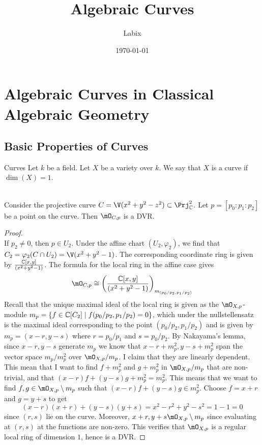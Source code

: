 \documentclass[a4paper]{article}
\title{Algebraic Curves}
\author{Labix}
\date{\today}
\begin{document}
\maketitle
\begin{abstract}
\end{abstract}
\pagebreak
\tableofcontents
\pagebreak

\section{Algebraic Curves in Classical Algebraic Geometry}
\subsection{Basic Properties of Curves}
\begin{defn}{Curves}{} Let $k$ be a field. Let $X$ be a variety over $k$. We say that $X$ is a curve if $\dim(X)=1$. 
\end{defn}

\begin{eg}{}{}\\
Consider the projective curve $C=\V(x^2+y^2-z^2)\subset\Prj_\C^2$. Let $p=[p_0:p_1:p_2]$ be a point on the curve. Then $\mO_{C,p}$ is a DVR. 
\begin{proof}\\
If $p_2\neq 0$, then $p\in U_2$. Under the affine chart $(U_2,\varphi_2)$, we find that $C_2=\varphi_2(C\cap U_2)=\V(x^2+y^2-1)$. The corresponding coordinate ring is given by $\frac{\mathbb{C}[x,y]}{(x^2+y^2-1)}$. The formula for the local ring in the affine case gives $$\mO_{C,p}\cong\left(\frac{\C[x,y]}{(x^2+y^2-1)}\right)_{m_{(p_0/p_2,p_1/p_2)}}$$ Recall that the unique maximal ideal of the local ring is given as the $\mO_{X,p}$-module $m_p=\{f\in\mathbb{C}[C_2]\;|\;f(p_0/p_2,p_1/p_2)=0\}$, which under the nullstellensatz is the maximal ideal corresponding to the point $(p_0/p_2,p_1/p_2)$ and is given by $m_p=(x-r,y-s)$ where $r=p_0/p_1$ and $s=p_0/p_2$. By Nakayama's lemma, since $x-r,y-s$ generate $m_p$ we know that $x-r+m_p^2,y-s+m_p^2$ span the vector space $m_p/m_p^2$ over $\mO_{X,p}/m_p$. I claim that they are linearly dependent. This mean that I want to find $f+m_p^2$ and $g+m_p^2$ in $\mO_{X,p}/m_p$ that are non-trivial, and that $(x-r)f+(y-s)g+m_p^2=m_p^2$. This means that we want to find $f,g\in\mO_{X,p}\setminus m_p$ such that $(x-r)f+(y-s)g\in m_p^2$. Choose $f=x+r$ and $g=y+s$ to get $$(x-r)(x+r)+(y-s)(y+s)=x^2-r^2+y^2-s^2=1-1=0$$ since $(r,s)$ lie on the curve. Moreover, $x+r,y+s\mO_{X,p}\setminus m_p$ since evaluating at $(r,s)$ at the functions are non-zero. This verifies that $\mO_{X,p}$ is a regular local ring of dimension $1$, hence is a DVR. 
\end{proof}
\end{eg}
\end{document}
